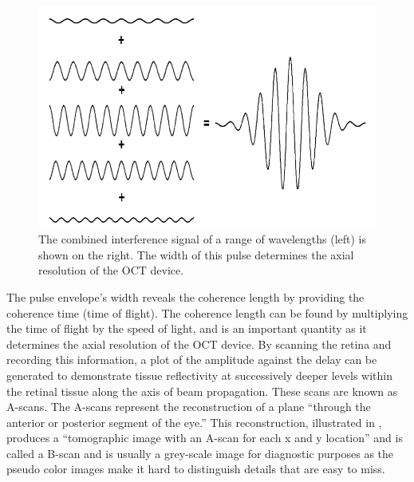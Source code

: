\begin{figure}[htbp]
\centering
\includegraphics{figures/morgan_2}
\caption{The combined interference signal of a range of wavelengths (left) is 
shown on the right.  The width of this pulse determines the axial resolution of 
the OCT device. \cite{mbib_6} }
\label{fig:m_2}
\end{figure}

The pulse envelope’s width reveals the coherence length by providing
the coherence time (time of flight).  The coherence length can be found
by multiplying the time of flight by the speed of light, and is an
important quantity as it determines the axial resolution of the OCT
device. \cite{mbib_6}  By scanning the retina and recording this
information, a plot of the amplitude against the delay can be generated to
demonstrate tissue reflectivity at successively deeper levels within the
retinal tissue along the axis of beam propagation. \cite{mbib_6}
These scans are known as A-scans.  The A-scans represent the reconstruction
of a plane “through the anterior or posterior segment of the eye.”\cite{mbib_6}
This reconstruction, illustrated in , produces a “tomographic
image with an A-scan for each x and y location” and is called a B-scan and is
usually a grey-scale image for diagnostic purposes as the pseudo color images
make it hard to distinguish details that are easy to miss. \cite{mbib_5,mbib_4,mbib_7}

